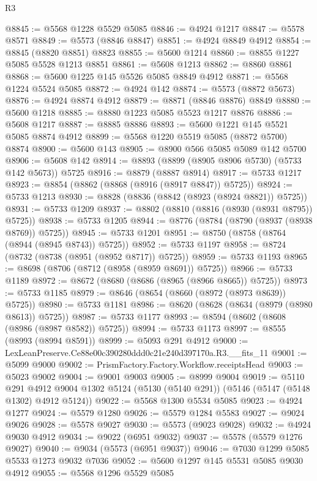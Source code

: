\begin{lexlean}{R3}
\begin{coremodule}
@8845 := @5568 @1228 @5529 @5085
@8846 := @4924 @1217
@8847 := @5578 @8571
@8849 := @5573 (@8846 @8847)
@8851 := @4924 @8849 @4912
@8854 := @8845 (@8820 @8851) @8823
@8855 := @5600 @1214
@8860 := @8855 @1227 @5085 @5528 @1213 @8851
@8861 := @5608 @1213
@8862 := @8860 @8861
@8868 := @5600 @1225 @145 @5526 @5085 @8849 @4912
@8871 := @5568 @1224 @5524 @5085
@8872 := @4924 @142
@8874 := @5573 (@8872 @5673)
@8876 := @4924 @8874 @4912
@8879 := @8871 (@8846 @8876) @8849
@8880 := @5600 @1218
@8885 := @8880 @1223 @5085 @5523 @1217 @8876
@8886 := @5608 @1217
@8887 := @8885 @8886
@8893 := @5600 @1221 @145 @5521 @5085 @8874 @4912
@8899 := @5568 @1220 @5519 @5085 (@8872 @5700) @8874
@8900 := @5600 @143
@8905 := @8900 @566 @5085 @5089 @142 @5700
@8906 := @5608 @142
@8914 := @8893 (@8899 (@8905 @8906 @5730) (@5733 @142 @5673)) @5725
@8916 := @8879 (@8887 @8914)
@8917 := @5733 @1217
@8923 := @8854 (@8862 (@8868 (@8916 (@8917 @8847)) @5725))
@8924 := @5733 @1213
@8930 := @8828 (@8836 (@8842 (@8923 (@8924 @8821)) @5725))
@8931 := @5733 @1209
@8937 := @8802 (@8810 (@8816 (@8930 (@8931 @8795)) @5725))
@8938 := @5733 @1205
@8944 := @8776 (@8784 (@8790 (@8937 (@8938 @8769)) @5725))
@8945 := @5733 @1201
@8951 := @8750 (@8758 (@8764 (@8944 (@8945 @8743)) @5725))
@8952 := @5733 @1197
@8958 := @8724 (@8732 (@8738 (@8951 (@8952 @8717)) @5725))
@8959 := @5733 @1193
@8965 := @8698 (@8706 (@8712 (@8958 (@8959 @8691)) @5725))
@8966 := @5733 @1189
@8972 := @8672 (@8680 (@8686 (@8965 (@8966 @8665)) @5725))
@8973 := @5733 @1185
@8979 := @8646 (@8654 (@8660 (@8972 (@8973 @8639)) @5725))
@8980 := @5733 @1181
@8986 := @8620 (@8628 (@8634 (@8979 (@8980 @8613)) @5725))
@8987 := @5733 @1177
@8993 := @8594 (@8602 (@8608 (@8986 (@8987 @8582)) @5725))
@8994 := @5733 @1173
@8997 := @8555 (@8993 (@8994 @8591))
@8999 := @5093 @291 @4912
@9000 := LexLeanPreserve.Ce88e00c390280ddd0c21e240d397170a.R3.__fits_11
@9001 := @5099 @9000
@9002 := PrismFactory.Factory.Workflow.receiptsHead
@9003 := @5023 @9002
@9004 := @9001 @9003
@9005 := @8999 @9004
@9019 := @5110
    @291
    @4912
    @9004
    @1302
    @5124
    (@5130 (@5140 @291))
    (@5146 (@5147 (@5148 @1302) @4912 @5124))
@9022 := @5568 @1300 @5534 @5085
@9023 := @4924 @1277
@9024 := @5579 @1280
@9026 := @5579 @1284 @5583
@9027 := @9024 @9026
@9028 := @5578 @9027
@9030 := @5573 (@9023 @9028)
@9032 := @4924 @9030 @4912
@9034 := @9022 (@6951 @9032)
@9037 := @5578 (@5579 @1276 @9027)
@9040 := @9034 (@5573 (@6951 @9037))
@9046 := @7030 @1299 @5085 @5533 @1273 @9032 @7036
@9052 := @5600 @1297 @145 @5531 @5085 @9030 @4912
@9055 := @5568 @1296 @5529 @5085

\end{coremodule}
\end{lexlean}

